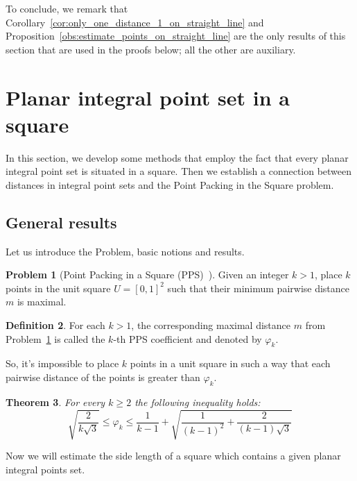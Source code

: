 \documentclass[a4paper,14pt]{article} %
\theoremstyle{plain}
\newtheorem{theorem}{Theorem}[section]
\theoremstyle{definition}
\newtheorem{definition}[theorem]{Definition}
\newtheorem{problem}[theorem]{Problem}
\begin{document}
To conclude, we remark that
Corollary~\ref{cor:only_one_distance_1_on_straight_line}
and
Proposition~\ref{obs:estimate_points_on_straight_line}
are the only results of this section
that are used in the proofs below;
all the other are auxiliary.



\section{Planar integral point set in a square}

In this section, we develop some methods that employ the fact that every planar integral point set is situated in a square.
Then we establish a connection between distances in integral point sets and the Point Packing in the Square problem.

\subsection{General results}

Let us introduce the Problem, basic notions and results.

\begin{problem}[Point Packing in a Square (PPS)~\cite{locatelli2002packing,costa2013valid}]
	\label{problem:PPS}
	Given an integer $k > 1$, place $k$ points in the unit square $U = [ 0 , 1 ]^2$ such that their
	minimum pairwise distance $m$ is maximal.
\end{problem}

\begin{definition}
	For each $k > 1$, the corresponding maximal distance $m$ from Problem~\ref{problem:PPS}
	is called the $k$-th PPS coefficient and denoted by $\varphi_k$.
\end{definition}
So, it's impossible to place $k$ points in a unit square in such a way that each pairwise distance of the points is greater than $\varphi_k$.


\begin{theorem}
	\label{thm:varphi_k_bounds}
	\cite{costa2013valid}
	For every $k\geq 2$ the following inequality holds:
	\begin{equation*}
		\sqrt{\frac{2}{k\sqrt{3}}}
		\leq
		\varphi_k
		\leq
		\frac{1}{k-1} +
		\sqrt{
			\frac{1}{(k-1)^2}
			+
			\frac{2}{(k-1)\sqrt{3}}
		}
	\end{equation*}
\end{theorem}

Now we will estimate the side length of a square which contains a given planar integral points set.
\end{document}
